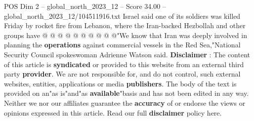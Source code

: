 \begin{textsample}{POS Dim 2 – global\_north\_2023\_12 – Score 34.00 – global\_north\_2023\_12/104511916.txt}
Israel said one of its soldiers was killed Friday by rocket fire from Lebanon, where the Iran-backed Hezbollah and other groups have @ @ @ @ @ @ @ @ @ @"We know that Iran was deeply involved in planning the \textbf{operations} against commercial vessels in the Red Sea,"National Security Council spokeswoman Adrienne Watson said. \textbf{Disclaimer} : The content of this article is \textbf{syndicated} or provided to this website from an external third party \textbf{provider}.
We are not responsible for, and do not control, such external websites, entities, applications or media \textbf{publishers}.
The body of the text is provided on an"as is"and"as \textbf{available}"basis and has not been edited in any way.
Neither we nor our affiliates guarantee the \textbf{accuracy} of or endorse the views or opinions expressed in this article.
Read our full \textbf{disclaimer} policy here.

\end{textsample}
